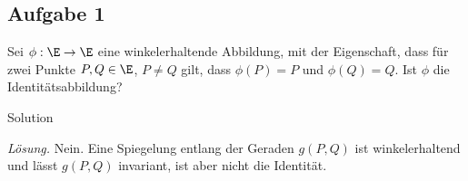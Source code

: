 \subsection*{Aufgabe 1}\mbox{}
Sei $\phi: \E \rightarrow\E $ eine winkelerhaltende Abbildung, mit der Eigenschaft, dass f\"ur zwei Punkte $P,Q\in \E$, $P\neq Q$ gilt, dass $\phi(P)=P$ und $\phi(Q)=Q$. Ist $\phi$ die Identit\"atsabbildung?


\begin{taggedblock}{Solution}
    


\smallskip 
\noindent \emph{L\"osung.}\mbox{}
Nein. Eine Spiegelung entlang der Geraden $g(P,Q)$ ist winkelerhaltend und l\"asst $g(P,Q)$ invariant, ist aber nicht die Identit\"at. 

\end{taggedblock}
